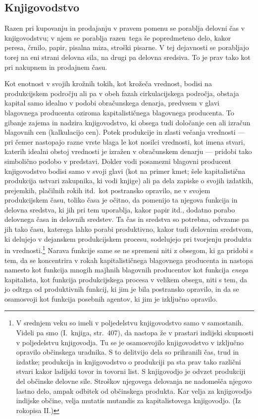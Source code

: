 \documentclass[kapital_02.tex]{subfiles}
\begin{document}
\subsection{Knjigovodstvo}
Razen pri kupovanju in prodajanju v pravem pomenu se porablja delovni čas v knjigovodstvu; v njem se porablja razen\KPEstran\ tega še popredmeteno delo, kakor peresa, črnilo, papir, pisalna miza, stroški pisarne.
V tej dejavnosti se porabljajo torej na eni strani delovna sila, na drugi pa delovna sredsiva.
To je prav tako kot pri nakupnem in prodajnem času.

Kot enotnost v svojih krožnih tokih, kot krožeča vrednost, bodisi na produkcijskem področju ali pa v obeh fazah cirkulacijskega področja, obstaja kapital samo idealno v podobi obračunskega denarja, predvsem v glavi blagovnega producenta oziroma kapitalističnega blagovnega producenta.
To gibanje zajema in nadzira knjigovodstvo, ki obsega tudi določanje cen ali izračun blagovnih cen (kalkulacijo cen).
Potek produkcije in zlasti večanja vrednosti — pri čemer nastopajo razne vrste blaga le kot nosilci vrednosti, kot imena stvari, katerih idealni obstoj vrednosti je izražen v obračunskem denarju — pridobi tako simbolično podobo v predstavi.
Dokler vodi posamezni blagovni producent knjigovodstvo bodisi samo v svoji glavi (kot na primer kmet; šele kapitalistična produkcija ustvari zakupnika, ki vodi knjige) ali pa dela zapiske o svojih izdatkih, prejemkih, plačilnih rokih itd.\ kot postransko opravilo, ne v svojem produkcijskem času, toliko časa je očitno, da pomenijo ta njegova funkcija in delovna sredstva, ki jih pri tem uporablja, kakor papir itd., dodatno porabo delovnega časa in delovnih sredstev.
Ta čas in sredstva so potrebna, odvzame pa jih tako času, katerega lahko porabi produktivno, kakor tudi delovnim sredstvom, ki delujejo v dejanskem produkcijskem procesu, sodelujejo pri tvorjenju produkta in vrednosti.\footnote
{V srednjem veku so imeli v poljedelstvu knjigovodstvo samo v samostanih.
Videli pa smo (I.\ knjiga, str.\ 407), da nastopa že v prastari indijski skupnosti v poljedelstvu knjigovodja.
Tu se je osamosvojilo knjigovodstvo v izključno opravilo občinskega uradnika.
S to delitvijo dela so prihranili čas, trud in izdatke; produkcija in knjigovodstvo o produkciji pa sta prav tako različni stvari kakor ladijski tovor in tovorni list.
S knjigovodjo je odvzet produkciji del občinske delovne sile.
Stroškov njegovega delovanja ne nadomešča njegovo lastno delo, ampak odbitek od občinskega produkta.
Kar velja za knjigovodjo indijske občine, velja mutatis mutandis za kapitalistovega knjigovodjo. (Iz rokopisa II.)}
Narava funkcije same se ne spremeni niti z obsegom, ki ga pridobi s tem, da se koncentrira v rokah kapitalističnega blagovnega producenta in nastopa namesto kot funkcija mnogih majhnih blagovnih producentov kot funkcija \emph{enega} kapitalista, kot funkcija produkcijskega procesa v velikem obsegu, niti s tem, da jo odtrga od produktivnih funkcij, ki jim je bila postransko opravilo, in da se osamosvoji kot funkcija posebnih agentov, ki jim je izključno opravilo.
\end{document}

